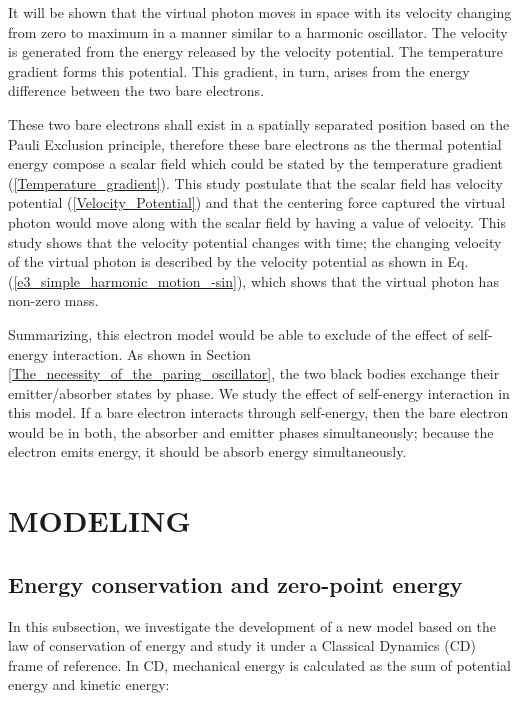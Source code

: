 \documentclass[%
 reprint,
 amsmath,amssymb,
 aps,
]{revtex4-1}
\numberwithin{equation}{section}
\begin{document}
    It will be shown that the virtual photon moves in space with its velocity changing from zero to maximum in a manner similar to a harmonic oscillator. The velocity is generated from the energy released by the velocity potential. The temperature gradient forms this potential. This gradient, in turn, arises from the energy difference between the two bare electrons.

    These two bare electrons shall exist in a spatially separated position based on the Pauli Exclusion principle, therefore these bare electrons as the thermal potential energy compose a scalar field which could be stated by the temperature gradient (\ref{Temperature_gradient}). This study postulate that the scalar field has velocity potential (\ref{Velocity_Potential}) and that the centering force captured the virtual photon would move along with the scalar field by having a value of velocity. This study shows that the velocity potential changes with time; the changing velocity of the virtual photon is described by the velocity potential as shown in Eq.(\ref{e3_simple_harmonic_motion_-sin}), which shows that the virtual photon has non-zero mass.

    Summarizing, this electron model would be able to exclude of the effect of self-energy interaction. As shown in Section \ref{The_necessity_of_the_paring_oscillator}, the two black bodies exchange their emitter/absorber states by phase. We study the effect of self-energy interaction in this model. If a bare electron interacts through self-energy, then the bare electron would be in both, the absorber and emitter phases simultaneously; because the electron emits energy, it should be absorb energy simultaneously.

\section{\label{sec:MODELING}MODELING}

\subsection{Energy conservation and zero-point energy}  \label{Energy_conservation_and_zero-point_energy}

    In this subsection, we investigate the development of a new model based on the law of conservation of energy and study it under a Classical Dynamics (CD) frame of reference. In CD, mechanical energy is calculated as the sum of potential energy and kinetic energy:
\end{document}
